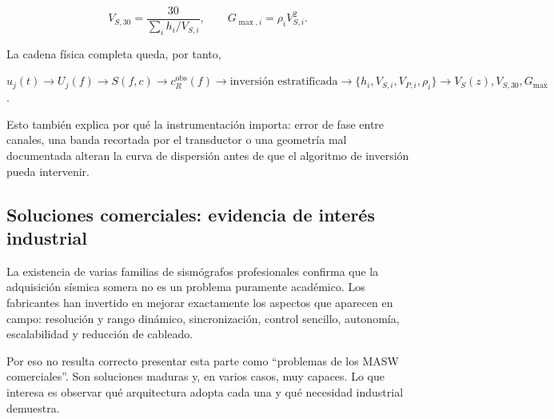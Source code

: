 \begin{equation}
    V_{S,30}=\frac{30}{\displaystyle\sum_i h_i/V_{S,i}},
    \qquad
    G_{\max,i}=\rho_i V_{S,i}^{2}.
\end{equation}

La cadena física completa queda, por tanto,

\begin{center}
\small
$u_j(t)\rightarrow U_j(f)\rightarrow S(f,c)\rightarrow
c_R^{\mathrm{obs}}(f)\rightarrow
\text{inversión estratificada}\rightarrow
\{h_i,V_{S,i},V_{P,i},\rho_i\}\rightarrow V_S(z),V_{S,30},G_{\max}$.
\end{center}

Esto también explica por qué la instrumentación importa: error de fase entre canales,
una banda recortada por el transductor o una geometría mal documentada alteran la curva
de dispersión antes de que el algoritmo de inversión pueda intervenir.

\subsection{Soluciones comerciales: evidencia de interés industrial}

La existencia de varias familias de sismógrafos profesionales confirma que la
adquisición sísmica somera no es un problema puramente académico. Los fabricantes han
invertido en mejorar exactamente los aspectos que aparecen en campo: resolución y rango
dinámico, sincronización, control sencillo, autonomía, escalabilidad y reducción de
cableado.

Por eso no resulta correcto presentar esta parte como ``problemas de los MASW
comerciales''. Son soluciones maduras y, en varios casos, muy capaces. Lo que interesa
es observar qué arquitectura adopta cada una y qué necesidad industrial demuestra.


